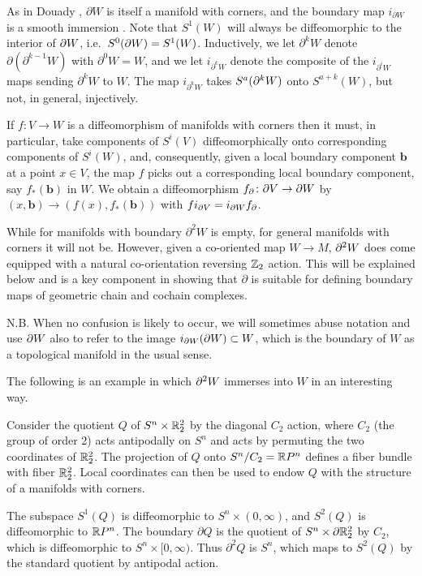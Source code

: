 As in Douady \cite{Doua61}, $\partial W$ is itself a manifold with corners, and the boundary map $i_{\partial W}$ is a smooth immersion \cite[Theorem 3.4]{Joy12}.
Note that $S^1(W)$ will always be diffeomorphic to the interior of $\partial W$, i.e.\ $S^0(\partial W)=S^1(W)$.
Inductively, we let $\partial^k W$ denote $\partial (\partial^{k-1} W)$ with $\partial^0 W = W$, and we let $i_{\partial^k W}$ denote the composite of the $i_{\partial^i W}$
maps sending $\partial^k W$ to $W$.
The map $i_{\partial^k W}$ takes $S^a(\partial^k W)$ onto $S^{a+k}(W)$, but not, in general, injectively.

\begin{remark}\label{R: bd diff}
	If $f \colon V\to W$ is a diffeomorphism of manifolds with corners then it must, in particular, take components of $S^i(V)$ diffeomorphically onto corresponding components of $S^i(W)$, and, consequently, given a local boundary component $\mathbf{b}$ at a point $x\in V$, the map $f$ picks out a corresponding local boundary component, say $f_*(\mathbf{b})$ in $W$.
	We obtain a diffeomorphism $f_\partial \colon \partial V\to \partial W$ by $(x,\mathbf{b}) \to (f(x),f_*(\mathbf{b}))$
	with $fi_{\partial V}= i_{\partial W} f_\partial$.
\end{remark}

While for manifolds with boundary $\partial^2W$ is empty, for general manifolds with corners it will not be.
However, given a co-oriented map $W\to M$, $\partial^2W$ does come equipped with a natural co-orientation reversing $\mathbb{Z}_2$ action.
This will be explained below and is a key component in showing that $\partial$ is suitable for defining boundary maps of geometric chain and cochain complexes.

N.B.
When no confusion is likely to occur, we will sometimes abuse notation and use $\partial W$ also to refer to the image $i_{\partial W}(\partial W)\subset W$, which is the boundary of $W$ as a topological manifold in the usual sense.

The following is an example in which $\partial^2 W$ immerses into $W$ in an interesting way.

\begin{example} \label{boundary}
	Consider the quotient $Q$ of $S^n \times \mathbb{R}^2_2$ by the diagonal $C_2$ action, where $C_2$ (the group of order 2) acts antipodally on $S^n$ and acts by permuting the two coordinates
	of $\mathbb{R}^2_2$.
	The projection of $Q$ onto $S^n / C_2 = \mathbb{R} P^n$ defines a fiber bundle with fiber $\mathbb{R}^2_2$.
	Local coordinates can then be used to endow $Q$ with the structure of a manifolds with corners.

	The subspace $S^1(Q)$ is diffeomorphic to $S^n \times (0,\infty)$, and $S^2(Q)$ is diffeomorphic to $\mathbb{R} P^n$.
	The boundary $\partial Q$ is the quotient of $S^n \times \partial \mathbb{R}^2_2$ by $C_2$, which is diffeomorphic to
	$S^n \times [0,\infty)$.
	Thus $\partial^2 Q$ is $S^n$, which maps to $S^2(Q)$ by the standard quotient by antipodal action.
\end{example}

